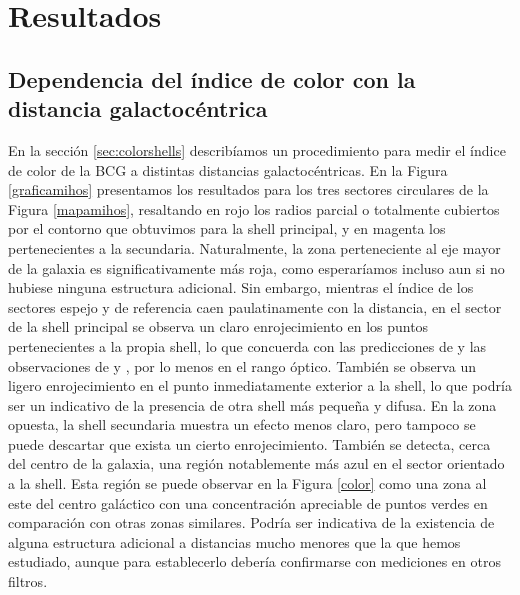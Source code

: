 \section{Resultados} \label{sec:resultados}
\subsection{Dependencia del índice de color con la distancia galactocéntrica} \label{sec:mihos}
En la sección \ref{sec:colorshells} describíamos un procedimiento para medir el índice de color de la BCG a distintas distancias galactocéntricas. En la Figura \ref{graficamihos} presentamos los resultados para los tres sectores circulares de la Figura \ref{mapamihos}, resaltando en rojo los radios parcial o totalmente cubiertos por el contorno que obtuvimos para la shell principal, y en magenta los pertenecientes a la secundaria. Naturalmente, la zona perteneciente al eje mayor de la galaxia es significativamente más roja, como esperaríamos incluso aun si no hubiese ninguna estructura adicional. Sin embargo, mientras el índice de los sectores espejo y de referencia caen paulatinamente con la distancia, en el sector de la shell principal se observa un claro enrojecimiento en los puntos pertenecientes a la propia shell, lo que concuerda con las predicciones de \citet{popGalaxiesShellsIllustris2017} y las observaciones de \citet{mihosStelLARPOPULATIONSOUTER2013} y \citet{limanetoNGC4104Shell2020}, por lo menos en el rango óptico. También se observa un ligero enrojecimiento en el punto inmediatamente exterior a la shell, lo que podría ser un indicativo de la presencia de otra shell más pequeña y difusa. En la zona opuesta, la shell secundaria muestra un efecto menos claro, pero tampoco se puede descartar que exista un cierto enrojecimiento. También se detecta, cerca del centro de la galaxia, una región notablemente más azul en el sector orientado a la shell. Esta región se puede observar en la Figura \ref{color} como una zona al este del centro galáctico con una concentración apreciable de puntos verdes en comparación con otras zonas similares. Podría ser indicativa de la existencia de alguna estructura adicional a distancias mucho menores que la que hemos estudiado, aunque para establecerlo debería confirmarse con mediciones en otros filtros. \par

